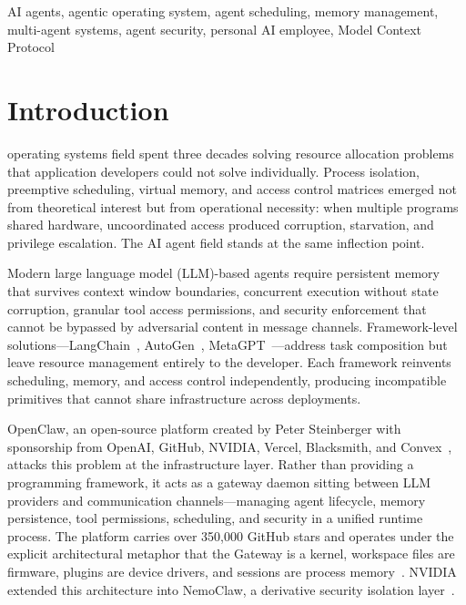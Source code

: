 \documentclass[journal]{IEEEtran}
\begin{document}
\begin{IEEEkeywords}
AI agents, agentic operating system, agent scheduling, memory management,
multi-agent systems, agent security, personal AI employee, Model Context Protocol
\end{IEEEkeywords}

\section{Introduction}

 operating systems field spent three decades solving
resource allocation problems that application developers could not solve
individually. Process isolation, preemptive scheduling, virtual memory, and
access control matrices emerged not from theoretical interest but from
operational necessity: when multiple programs shared hardware, uncoordinated
access produced corruption, starvation, and privilege escalation. The AI agent
field stands at the same inflection point.

Modern large language model (LLM)-based agents require persistent memory that survives context window
boundaries, concurrent execution without state corruption, granular tool access
permissions, and security enforcement that cannot be bypassed by adversarial
content in message channels. Framework-level solutions---LangChain~\cite{chase2022langchain},
AutoGen~\cite{wu2023autogen}, MetaGPT~\cite{hong2023metagpt}---address task
composition but leave resource management entirely to the developer. Each
framework reinvents scheduling, memory, and access control independently,
producing incompatible primitives that cannot share infrastructure across
deployments.

OpenClaw, an open-source platform created by Peter Steinberger with
sponsorship from OpenAI, GitHub, NVIDIA, Vercel, Blacksmith, and
Convex~\cite{openclaw2024github}, attacks this problem at the infrastructure
layer. Rather than providing a programming framework, it acts as a gateway
daemon sitting between LLM providers and communication channels---managing
agent lifecycle, memory persistence, tool permissions, scheduling, and security
in a unified runtime process. The platform carries over 350,000 GitHub stars
and operates under the explicit architectural metaphor that the Gateway is a
kernel, workspace files are firmware, plugins are device drivers, and sessions
are process memory~\cite{openclaw2024github}. NVIDIA extended this architecture
into NemoClaw, a derivative security isolation layer~\cite{openclaw2024docs}.
\end{document}
